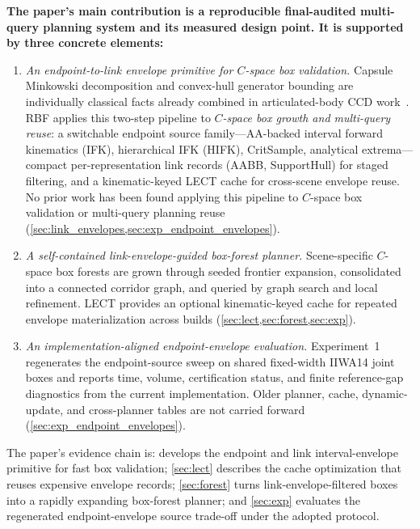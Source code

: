 \documentclass[journal]{IEEEtran}
\DeclareRobustCommand{\textsc}[1]{\textnormal{\MakeUppercase{#1}}}
\newcommand{\rbf}{\textsc{RBF}}
\begin{document}
\textbf{The paper's main contribution is a reproducible final-audited
multi-query planning system and its measured design point. It is supported by
three concrete elements:}
\begin{enumerate}[nosep]
  \item \emph{An endpoint-to-link envelope primitive for $C$-space box validation.}
  Capsule Minkowski decomposition and convex-hull generator bounding are
  individually classical facts already combined in articulated-body CCD
  work~\cite{redon2004ccd_avatar,redon2005fast_artic,zhang2007taylor}.
  \rbf{} applies this two-step pipeline to \emph{$C$-space box growth and
  multi-query reuse}: a switchable endpoint source family---AA-backed
  interval forward kinematics (IFK), hierarchical IFK (HIFK),
  CritSample, analytical extrema---compact
  per-representation link records (AABB, SupportHull) for staged
  filtering, and a kinematic-keyed LECT cache for cross-scene envelope reuse.
  No prior work has been found applying this pipeline to $C$-space box
  validation or multi-query planning reuse
  (\cref{sec:link_envelopes,sec:exp_endpoint_envelopes}).

  \item \emph{A self-contained link-envelope-guided box-forest planner.}
  Scene-specific $C$-space box forests are grown through seeded frontier
  expansion, consolidated into a connected corridor graph, and queried by
  graph search and local refinement. LECT provides an optional
  kinematic-keyed cache for repeated envelope materialization across builds
  (\cref{sec:lect,sec:forest,sec:exp}).

  \item \emph{An implementation-aligned endpoint-envelope evaluation.}
  Experiment~1 regenerates the endpoint-source sweep on shared fixed-width
  IIWA14 joint boxes and reports time, volume, certification status, and finite
  reference-gap diagnostics from the current implementation. Older planner,
  cache, dynamic-update, and cross-planner tables are not carried forward
  (\cref{sec:exp_endpoint_envelopes}).
\end{enumerate}

The paper's evidence chain is:  develops the endpoint
and link interval-envelope primitive for fast box validation; \cref{sec:lect}
describes the cache optimization that reuses expensive envelope records;
\cref{sec:forest} turns link-envelope-filtered boxes into a rapidly expanding
box-forest planner; and \cref{sec:exp} evaluates the regenerated
endpoint-envelope source trade-off under the adopted protocol.
\end{document}

